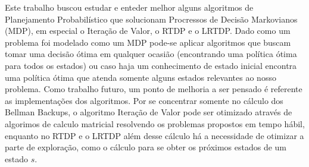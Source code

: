 \documentclass[letterpaper]{article}
\begin{document}
Este trabalho buscou estudar e enteder melhor alguns algoritmos de Planejamento Probabilístico que solucionam Procressos de Decisão Markovianos (MDP), em especial o Iteração de Valor, o RTDP e o LRTDP. Dado como um problema foi modelado como um MDP pode-se aplicar algoritmos que buscam tomar uma decisão ótima em qualquer ocasião (encontrando uma política ótima para todos os estados) ou caso haja um conhecimento de estado inicial encontra uma política ótima que atenda somente alguns estados relevantes ao nosso problema.
Como trabalho futuro, um ponto de melhoria a ser pensado é referente as implementações dos algoritmos. Por se concentrar somente no cálculo dos Bellman Backups, o algoritmo Iteração de Valor pode ser otimizado através de algorimos de calculo matricial resolvendo os problemas propostos em tempo hábil, enquanto no RTDP e o LRTDP além desse cálculo há a necessidade de otimizar a parte de exploração, como o cálculo para se obter os próximos estados de um estado $s$.



\end{document}
